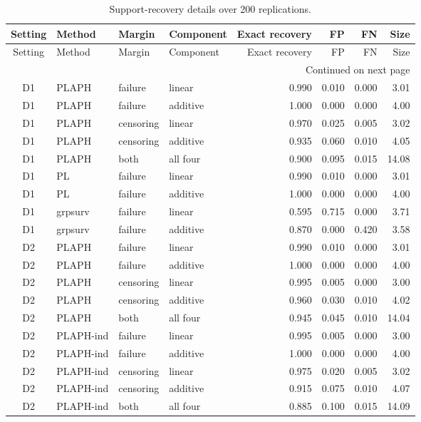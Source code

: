 \begin{longtable}{clllrrrr}
\caption{Support-recovery details over 200 replications.}
\label{tab:e10-selection-detail}\\
\toprule
Setting & Method & Margin & Component & Exact recovery & FP & FN & Size \\
\midrule
\endfirsthead
\toprule
Setting & Method & Margin & Component & Exact recovery & FP & FN & Size \\
\midrule
\endhead
\midrule
\multicolumn{8}{r}{Continued on next page} \\
\endfoot
\bottomrule
\endlastfoot
D1 & PLAPH & failure & linear & 0.990 & 0.010 & 0.000 & 3.01 \\
D1 & PLAPH & failure & additive & 1.000 & 0.000 & 0.000 & 4.00 \\
D1 & PLAPH & censoring & linear & 0.970 & 0.025 & 0.005 & 3.02 \\
D1 & PLAPH & censoring & additive & 0.935 & 0.060 & 0.010 & 4.05 \\
D1 & PLAPH & both & all four & 0.900 & 0.095 & 0.015 & 14.08 \\
D1 & PL & failure & linear & 0.990 & 0.010 & 0.000 & 3.01 \\
D1 & PL & failure & additive & 1.000 & 0.000 & 0.000 & 4.00 \\
D1 & grpsurv & failure & linear & 0.595 & 0.715 & 0.000 & 3.71 \\
D1 & grpsurv & failure & additive & 0.870 & 0.000 & 0.420 & 3.58 \\
D2 & PLAPH & failure & linear & 0.990 & 0.010 & 0.000 & 3.01 \\
D2 & PLAPH & failure & additive & 1.000 & 0.000 & 0.000 & 4.00 \\
D2 & PLAPH & censoring & linear & 0.995 & 0.005 & 0.000 & 3.00 \\
D2 & PLAPH & censoring & additive & 0.960 & 0.030 & 0.010 & 4.02 \\
D2 & PLAPH & both & all four & 0.945 & 0.045 & 0.010 & 14.04 \\
D2 & PLAPH-ind & failure & linear & 0.995 & 0.005 & 0.000 & 3.00 \\
D2 & PLAPH-ind & failure & additive & 1.000 & 0.000 & 0.000 & 4.00 \\
D2 & PLAPH-ind & censoring & linear & 0.975 & 0.020 & 0.005 & 3.02 \\
D2 & PLAPH-ind & censoring & additive & 0.915 & 0.075 & 0.010 & 4.07 \\
D2 & PLAPH-ind & both & all four & 0.885 & 0.100 & 0.015 & 14.09 \\

\end{longtable}
